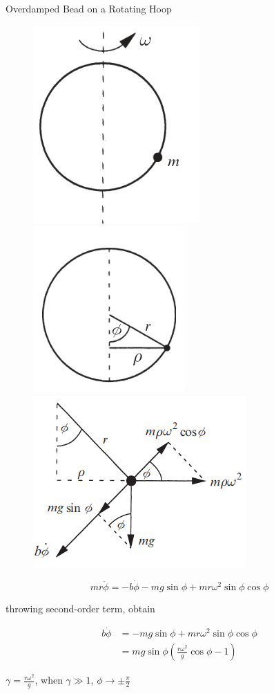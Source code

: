 \documentclass[9pt,aspectratio=43,mathserif,table]{beamer}
\begin{document}
\begin{frame}{Overdamped Bead on a Rotating Hoop}

  \begin{multicols}{2}
    \begin{figure}[!h]
      \centering
      \includegraphics[width=.12\textwidth]{fig/overdamped1.png}
      \includegraphics[width=.12\textwidth]{fig/overdamped2.png}
      \includegraphics[width=.12\textwidth]{fig/forceanalysis.png}

    \end{figure}

    $$m r \ddot\phi = - b \dot \phi - mg \sin \phi + m r \omega ^2 \sin\phi\cos\phi$$

    throwing second-order term, obtain


    \begin{equation}
      \begin{aligned}
        b \dot \phi &= - mg \sin \phi + m r \omega ^2 \sin\phi\cos\phi \\
                    &= mg\sin\phi(\frac{ r\omega ^2}{g}\cos\phi - 1)
      \end{aligned}
    \end{equation}

    $\gamma = \frac{ r \omega ^ 2}{g}$, when $\gamma \gg 1$, $\phi \rightarrow \pm \frac{ \pi}{2}$


\end{multicols}
\end{frame}
\end{document}
